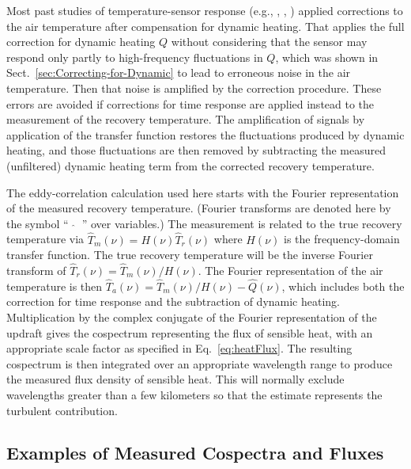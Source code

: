 \documentclass[amt, manuscript]{copernicus}
\begin{document}
Most past studies of temperature-sensor response (e.g.,
\citet{mccarthy1973method}, \citet{nicholls1978measurements},
\citet{InverarityJTech2000}) applied corrections to the air temperature
after compensation for dynamic heating. That applies the full correction
for dynamic heating \(Q\) without considering that the sensor may
respond only partly to high-frequency fluctuations in \(Q\), which was
shown in Sect.~\ref{sec:Correcting-for-Dynamic} to lead to erroneous
noise in the air temperature. Then that noise is amplified by the
correction procedure. These errors are avoided if corrections for time
response are applied instead to the measurement of the recovery
temperature. The amplification of signals by application of the transfer
function restores the fluctuations produced by dynamic heating, and
those fluctuations are then removed by subtracting the measured
(unfiltered) dynamic heating term from the corrected recovery
temperature.

The eddy-correlation calculation used here starts with the Fourier
representation of the measured recovery temperature. (Fourier transforms
are denoted here by the symbol ``~\(\widehat{~}\)~'' over variables.)
The measurement is related to the true recovery temperature via
\(\hat{T}_{m}(\nu)=H(\nu)\hat{T}_{r}(\nu)\) where \(H(\nu)\) is the
frequency-domain transfer function. The true recovery temperature will
be the inverse Fourier transform of
\(\hat{T}_{r}(\nu)=\hat{T}_{m}(\nu)/H(\nu)\). The Fourier representation
of the air temperature is then
\(\hat{T}_{a}(\nu)=\hat{T}_{m}(\nu)/H(\nu)-\hat{Q}(\nu)\), which
includes both the correction for time response and the subtraction of
dynamic heating. Multiplication by the complex conjugate of the Fourier
representation of the updraft gives the cospectrum representing the flux
of sensible heat, with an appropriate scale factor as specified in
Eq.~\eqref{eq:heatFlux}. The resulting cospectrum is then integrated
over an appropriate wavelength range to produce the measured flux
density of sensible heat. This will normally exclude wavelengths greater
than a few kilometers so that the estimate represents the turbulent
contribution.

\subsection{Examples of Measured Cospectra and Fluxes}
\end{document}
